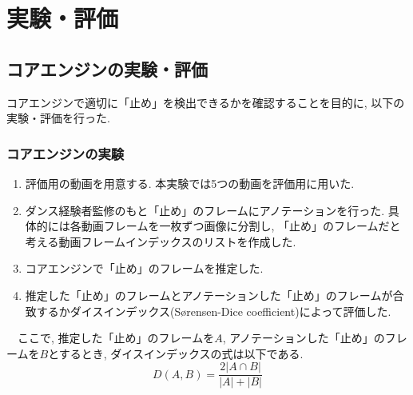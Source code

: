 \documentclass[paper]{ieicej}
\begin{document}
\section{実験・評価}
\subsection{コアエンジンの実験・評価}
コアエンジンで適切に「止め」を検出できるかを確認することを目的に, 以下の実験・評価を行った. 
\subsubsection{コアエンジンの実験}
\begin{enumerate}[label=\arabic*., nosep]
  \item 評価用の動画を用意する. 本実験では5つの動画を評価用に用いた. 
  \item ダンス経験者監修のもと「止め」のフレームにアノテーションを行った. 具体的には各動画フレームを一枚ずつ画像に分割し, 「止め」のフレームだと考える動画フレームインデックスのリストを作成した.
  \item コアエンジンで「止め」のフレームを推定した. 
  \item 推定した「止め」のフレームとアノテーションした「止め」のフレームが合致するかダイスインデックス(Sørensen-Dice coefficient)によって評価した.
\end{enumerate}
　ここで, 推定した「止め」のフレームを$A$, アノテーションした「止め」のフレームを$B$とするとき, ダイスインデックスの式は以下である. 
\begin{equation}
  D(A,B)=\frac{2|A∩B|}{|A|+|B|}
\end{equation}
\end{document}
